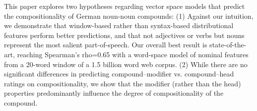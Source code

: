 This paper explores two hypotheses regarding vector space models that predict the compositionality of German noun-noun compounds: (1) Against our intuition,
 we demonstrate that window-based rather than syntax-based distributional
 features perform better predictions, and that not adjectives or verbs but nouns
 represent the most salient part-of-speech. Our overall best result is
 state-of-the-art, reaching Spearman's rho=0.65 with a word-space model of
 nominal features from a 20-word window of a 1.5 billion word web corpus. (2)
 While there are no significant differences in predicting compound--modifier vs.
 compound--head ratings on compositionality, we show that the modifier (rather
 than the head) properties predominantly influence the degree of
 compositionality of the compound.

